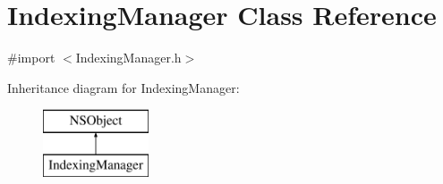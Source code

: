 \hypertarget{interface_indexing_manager}{\section{Indexing\-Manager Class Reference}
\label{interface_indexing_manager}
}


{\ttfamily \#import $<$Indexing\-Manager.\-h$>$}

Inheritance diagram for Indexing\-Manager\-:\begin{figure}[H]
\begin{center}
\leavevmode
\includegraphics[height=2.000000cm]{interface_indexing_manager}
\end{center}
\end{figure}

